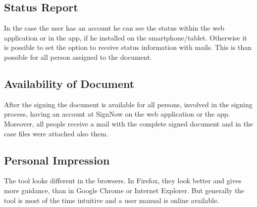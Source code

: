 \subsection{Status Report}
In the case the user has an account he can see the status within the web application or in the \gls{app}, if he installed on the smartphone/tablet. Otherwise it is possible to set the option to receive status information with mails. This is than possible for all person assigned to the document.

\subsection{Availability of Document}
After the signing the document is available for all persons, involved in the signing process, having an account at SignNow on the web application or the \gls{app}. Moreover, all people receive a mail with the complete signed document and in the case files were attached also them. 

\subsection{Personal Impression}
The tool looks different in the browsers. In Firefox, they look better and gives more guidance, than in Google Chrome or Internet Explorer. But generally the tool is most of the time intuitive and a user manual is online available. 